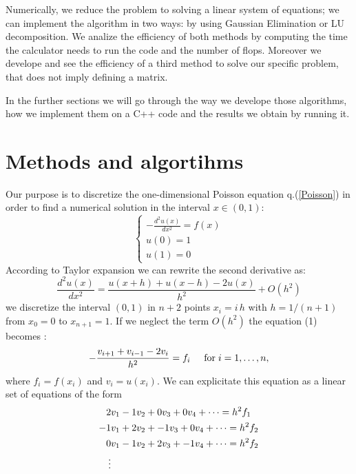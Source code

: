 \documentclass[10pt,showpacs,preprintnumbers,footinbib,amsmath,amssymb,aps,prl,twocolumn,groupedaddress,superscriptaddress,showkeys]{revtex4-1}
\begin{document}
Numerically, we reduce the problem to solving a linear system of equations; we can implement the algorithm in two ways: by using Gaussian Elimination or LU decomposition. We analize the efficiency of both methods by computing the time the calculator needs to run the code and the number of flops. Moreover we develope and see the efficiency of a third method to solve our specific problem, that does not imply defining a matrix.

In the further sections we will go through the way we develope those algorithms, how we implement them on a C++ code and the results we obtain by running it.



\section{Methods and algortihms}
Our purpose is to discretize the one-dimensional Poisson equation q.(\ref{Poisson}) in order to find a numerical solution in the interval $x\in(0,1)$:
\begin{equation}
\label{Poisson}
\begin{cases}
- \frac{d^2 u(x)}{dx^2} = f(x)\\
u(0) = 1 \\
u(1) = 0 
\end{cases}
\end{equation}
According to Taylor expansion we can rewrite the second derivative as:
\[
\frac{d^2 u(x)}{dx^2} = \frac{u(x+h) + u(x-h) - 2u(x)}{h^2} + O(h^2)
\]
we discretize the interval $(0,1)$ in $n+2$ points $x_i = i \, h$ with $h=1/(n+1)$ from $x_0 = 0$ to $x_{n+1} = 1$. If we neglect the term $O(h^2)$ the equation (1) becomes :
\begin{equation}
-\frac{v_{i+1}+v_{i-1}-2v_i}{h^2} = f_i  \hspace{0.5cm} \text{for} \hspace{0.1cm} i=1,\dots, n, \notag
\end{equation}
where $f_i=f(x_i)$ and $v_i = u(x_i)$.
We can explicitate this equation as a linear set of equations of the form
\begin{align} \notag	
2&v_1 - 1 v_2 + 0 v_3 + 0v_4+ \dots = h^2 f_1  \\ \notag
-1&v_1 + 2 v_2 + -1 v_3 + 0v_4+ \dots = h^2 f_2 \\ \notag
0&v_1 -1 v_2 + 2 v_3 + -1 v_4 + \dots = h^2 f_2 \\ \notag
\quad \vdots \notag
\end{align}
\end{document}
